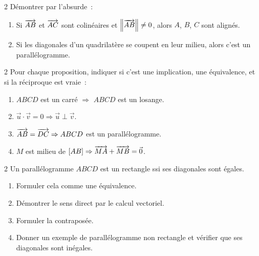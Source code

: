 \begin{bilan}
\begin{exo}{2}
D\'emontrer par l'absurde~:
\begin{enumerate}
  \item Si $\overrightarrow{AB}$ et $\overrightarrow{AC}$ sont colin\'eaires et $\left\|\overrightarrow{AB}\right\|\ne0$,
        alors $A$, $B$, $C$ sont align\'es.
  \item Si les diagonales d'un quadrilat\`ere se coupent en leur milieu,
        alors c'est un parall\'elogramme.
\end{enumerate}
\end{exo}

\begin{exo}{2}
Pour chaque proposition, indiquer si c'est une implication, une \'equivalence,
et si la r\'eciproque est vraie~:
\begin{enumerate}
  \item \og $ABCD$ est un carr\'e $\Rightarrow$ $ABCD$ est un losange.\fg
  \item \og $\vec{u}\cdot\vec{v}=0 \Rightarrow \vec{u}\perp\vec{v}$.\fg
  \item \og $\overrightarrow{AB}=\overrightarrow{DC} \Rightarrow ABCD$ est un parall\'elogramme.\fg
  \item \og $M$ est milieu de $[AB] \Rightarrow \overrightarrow{MA}+\overrightarrow{MB}=\vec{0}$.\fg
\end{enumerate}
\end{exo}

\begin{exo}{2}
Un parall\'elogramme $ABCD$ est un rectangle ssi ses diagonales sont \'egales.
\begin{enumerate}
  \item Formuler cela comme une \'equivalence.
  \item D\'emontrer le sens direct par le calcul vectoriel.
  \item Formuler la contrapos\'ee.
  \item Donner un exemple de parall\'elogramme non rectangle et v\'erifier
        que ses diagonales sont in\'egales.
\end{enumerate}
\end{exo}


\end{bilan}
